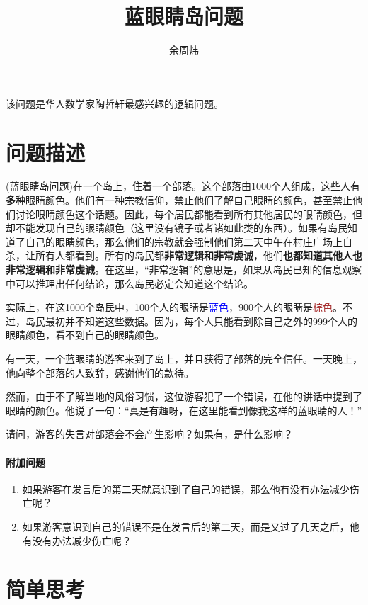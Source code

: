 \documentclass[lang=cn,11pt,a4paper]{elegantpaper}
\title{蓝眼睛岛问题}
\author{余周炜}
\date{\zhtoday}
\begin{document}
\maketitle

该问题是华人数学家陶哲轩最感兴趣的逻辑问题。

\section{问题描述}

(蓝眼睛岛问题)在一个岛上，住着一个部落。这个部落由1000个人组成，这些人有\textbf{多种}眼睛颜色。他们有一种宗教信仰，禁止他们了解自己眼睛的颜色，甚至禁止他们讨论眼睛颜色这个话题。因此，每个居民都能看到所有其他居民的眼睛颜色，但却不能发现自己的眼睛颜色（这里没有镜子或者诸如此类的东西）。如果有岛民知道了自己的眼睛颜色，那么他们的宗教就会强制他们第二天中午在村庄广场上自杀，让所有人都看到。所有的岛民都\textbf{非常逻辑和非常虔诚}，他们\textbf{也都知道其他人也非常逻辑和非常虔诚}。在这里，“非常逻辑”的意思是，如果从岛民已知的信息观察中可以推理出任何结论，那么岛民必定会知道这个结论。

实际上，在这1000个岛民中，100个人的眼睛是\textcolor{blue}{蓝色}，900个人的眼睛是\textcolor{brown}{棕色}。不过，岛民最初并不知道这些数据。因为，每个人只能看到除自己之外的999个人的眼睛颜色，看不到自己的眼睛颜色。

有一天，一个蓝眼睛的游客来到了岛上，并且获得了部落的完全信任。一天晚上，他向整个部落的人致辞，感谢他们的款待。

然而，由于不了解当地的风俗习惯，这位游客犯了一个错误，在他的讲话中提到了眼睛的颜色。他说了一句：“真是有趣呀，在这里能看到像我这样的蓝眼睛的人！”

请问，游客的失言对部落会不会产生影响？如果有，是什么影响？

\newpage

\paragraph{附加问题}
\begin{enumerate}
\item 如果游客在发言后的第二天就意识到了自己的错误，那么他有没有办法减少伤亡呢？
\item 如果游客意识到自己的错误不是在发言后的第二天，而是又过了几天之后，他有没有办法减少伤亡呢？
\end{enumerate}


\section{简单思考}
\end{document}
